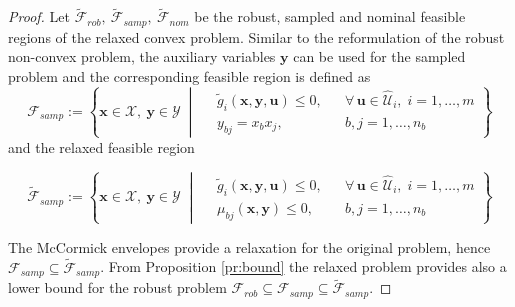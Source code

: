 \documentclass[10pt,a4paper]{amsart}
\begin{document}
\begin{proof}
Let $\tilde{\mathcal{F}}_{rob},~\tilde{\mathcal{F}}_{samp},~\tilde{\mathcal{F}}_{nom}$ be the robust, sampled and nominal feasible regions of the relaxed convex problem. Similar to the reformulation of the robust non-convex problem, the auxiliary variables $\bm y$ can be used for the sampled problem and the corresponding feasible region is defined as 
\begin{equation*}
    \mathcal{F}_{samp}:=\left\{\bm x\in \mathcal{X},~ \bm y \in \mathcal{Y} \;\middle|\;
\begin{aligned}
& \tilde{g}_i(\bm{x}, \bm{y}, \bm{u}) \le 0, && \forall\, \bm{u} \in \hat{\mathcal{U}}_i,\; i = 1, \dots, m \\
& y_{bj} = x_b x_j, && b,j = 1, \dots, n_b
\end{aligned}
\right\}
\end{equation*}
and the relaxed feasible region

\begin{equation*}
    \tilde{\mathcal{F}}_{samp}:=\left\{\bm x\in \mathcal{X},~ \bm y \in \mathcal{Y} \;\middle|\;
\begin{aligned}
& \tilde{g}_i(\bm{x}, \bm{y}, \bm{u}) \le 0, && \forall\, \bm{u} \in \hat{\mathcal{U}}_i,\; i = 1, \dots, m \\
& \mu_{bj}(\bm x,\bm y)\leq 0, && b,j = 1, \dots, n_b
\end{aligned}
\right\}
\end{equation*}

The McCormick envelopes provide a relaxation for the original problem, hence $\mathcal{F}_{samp}\subseteq\tilde{\mathcal{F}}_{samp}$. From Proposition \ref{pr:bound} the relaxed problem provides also a lower bound for the robust problem $\mathcal{F}_{rob}\subseteq \mathcal{F}_{samp} \subseteq \tilde{\mathcal{F}}_{samp}$.    
\end{proof}
\end{document}

